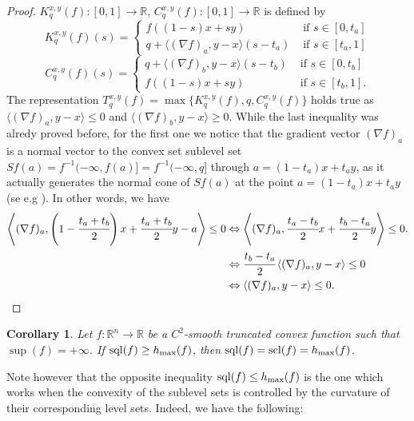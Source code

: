 \documentclass[12pt,twoside,reqno]{amsart}
\newtheorem{corollary}{Corollary}[section]
\theoremstyle{definition}
\numberwithin{equation}{section}
\begin{document}
\begin{proof}
$K_q^{x,y}(f):[0,1]\longrightarrow\mathbb{R}$, $C_q^{x,y}(f):[0,1]\longrightarrow\mathbb{R}$ is defined by
\[
K_q^{x,y}(f)(s)=\left\{
\begin{array}{cll}
f((1-s)x+sy) & \mbox{ if }s\in[0,t_a]\\
q+\langle (\nabla f)_a,y-x\rangle(s-t_a) & \mbox{ if }s\in[t_a,1]
\end{array}
\right.
\] 
\[
C_q^{x,y}(f)(s)=\left\{
\begin{array}{cll}
q+\langle (\nabla f)_b,y-x\rangle(s-t_b) & \mbox{ if }s\in[0,t_b]\\
f((1-s)x+sy) & \mbox{ if }s\in[t_b,1].
\end{array}
\right.
\] 
The representation $T_q^{x,y}(f)=\max\{K_q^{x,y}(f),q,C_q^{x,y}(f)\}$ holds true as $\langle (\nabla f)_a,y-x\rangle\leq 0$ and $\langle (\nabla f)_b,y-x\rangle\geq 0$. 
While the last inequality was alredy proved before, for the first one we notice that the gradient vector 
$(\nabla f)_a$ is a normal vector to the convex set sublevel set 
$Sf(a)=f^{-1}(-\infty,f(a)]=f^{-1}(-\infty,q]$
through $a=(1-t_a)x+t_ay$, 
as it actually generates the normal cone of $Sf(a)$ at the point $a=(1-t_a)x+t_ay$ (se e.g \cite[Theorem 1.3.5, p. 245]{Uruty-Lemarechal}). 
In other words, we have
\begin{align}
\left\langle (\nabla f)_a,\left(1-\cfrac{t_a+t_b}{2}\right)x+\cfrac{t_a+t_b}{2}y-a\right\rangle\leq 0 
& \Leftrightarrow \left\langle (\nabla f)_a,\cfrac{t_a-t_b}{2}x+\cfrac{t_b-t_a}{2}y\right\rangle\leq 0. \nonumber\\
& \Leftrightarrow \cfrac{t_b-t_a}{2}\left\langle (\nabla f)_a,y-x\right\rangle\leq 0 \nonumber\\
& \Leftrightarrow \left\langle (\nabla f)_a,y-x\right\rangle\leq 0. \nonumber
\end{align}
\end{proof}
\begin{corollary}\label{cor31.10.2025.1}
Let $f:\mathbb{R}^n\longrightarrow\mathbb{R}$ be a $C^2$-smooth truncated convex function such that $\sup(f)=+\infty$. If ${\rm sql}(f)\geq h_{\max}(f)$, then ${\rm sql}(f)={\rm scl}(f)=h_{\max}(f)$.
\end{corollary}
\noindent Note however that the opposite inequality ${\rm sql}(f)\leq h_{\max}(f)$ is the one which works when the convexity of the sublevel sets is controlled by the curvature of their corresponding level sets. Indeed, we have the following:
\end{document}
